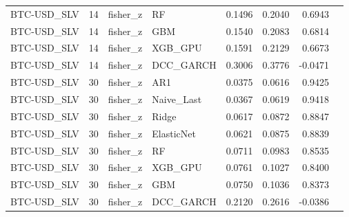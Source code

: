 \begin{table}[H]
\begin{tabular}{llllrrrr}
BTC-USD_SLV & 14 & fisher_z & RF & 0.1496 & 0.2040 & 0.6943 &  \\
BTC-USD_SLV & 14 & fisher_z & GBM & 0.1540 & 0.2083 & 0.6814 &  \\
BTC-USD_SLV & 14 & fisher_z & XGB_GPU & 0.1591 & 0.2129 & 0.6673 &  \\
BTC-USD_SLV & 14 & fisher_z & DCC_GARCH & 0.3006 & 0.3776 & -0.0471 &  \\
BTC-USD_SLV & 30 & fisher_z & AR1 & 0.0375 & 0.0616 & 0.9425 &  \\
BTC-USD_SLV & 30 & fisher_z & Naive_Last & 0.0367 & 0.0619 & 0.9418 &  \\
BTC-USD_SLV & 30 & fisher_z & Ridge & 0.0617 & 0.0872 & 0.8847 &  \\
BTC-USD_SLV & 30 & fisher_z & ElasticNet & 0.0621 & 0.0875 & 0.8839 &  \\
BTC-USD_SLV & 30 & fisher_z & RF & 0.0711 & 0.0983 & 0.8535 &  \\
BTC-USD_SLV & 30 & fisher_z & XGB_GPU & 0.0761 & 0.1027 & 0.8400 &  \\
BTC-USD_SLV & 30 & fisher_z & GBM & 0.0750 & 0.1036 & 0.8373 &  \\
BTC-USD_SLV & 30 & fisher_z & DCC_GARCH & 0.2120 & 0.2616 & -0.0386 &  \\
\bottomrule
\end{tabular}
\end{table}